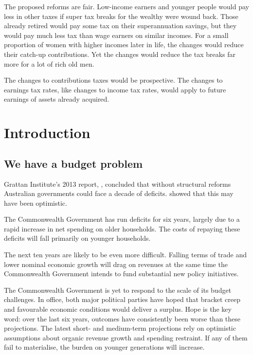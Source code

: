 \begin{overview}[-25pt]
The proposed reforms are fair. Low-income earners and younger people would pay less in other taxes if super tax breaks for the wealthy were wound back. Those already retired would pay some tax on their superannuation savings, but they would pay much less tax than wage earners on similar incomes. For a small proportion of women with higher incomes later in life, the changes would reduce their catch-up contributions. Yet the changes would reduce the tax breaks far more for a lot of rich old men. 

The changes to contributions taxes would be prospective. The changes to earnings tax rates, like changes to income tax rates, would apply to future earnings of assets already acquired.

\end{overview}
\addtolength{\columnsep}{-\overviewextra}

\chapter{Introduction}
\section{We have a budget problem}
Grattan Institute’s 2013 report, , concluded that without structural reforms Australian governments could face a decade of deficits.   showed that this may have been optimistic. 

The Commonwealth Government has run deficits for six years, largely due to a rapid increase in net spending on older households. The costs of repaying these deficits will fall primarily on younger households.%

The next ten years are likely to be even more difficult. Falling terms of trade and lower nominal economic growth will drag on revenues at the same time the Commonwealth Government intends to fund substantial new policy initiatives.

The Commonwealth Government is yet to respond to the scale of its budget challenges. In office, both major political parties have hoped that bracket creep and favourable economic conditions would deliver a surplus. Hope is the key word: over the last six years, outcomes have consistently been worse than these projections. The latest short- and medium-term projections rely on optimistic assumptions about organic revenue growth and spending restraint. If any of them fail to materialise, the burden on younger generations will increase.

